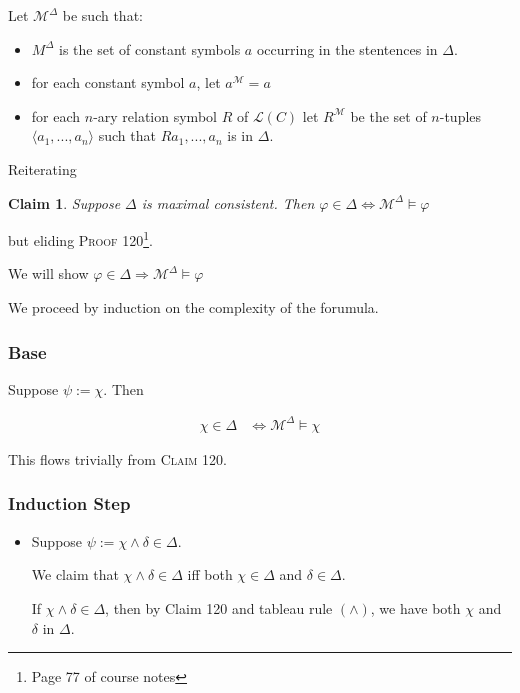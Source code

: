 \documentclass[a4paper]{article}
\newtheorem{claim}{Claim}
\newcommand{\MODEL}{\mathcal{M}}
\newcommand{\LANGUAGE}{\mathcal{L}}
\newcommand{\TUPLE}[1]{\langle {#1} \rangle}
\begin{document}
\begin{enumerate}
Let $\MODEL^{\Delta}$ be such that:

\begin{itemize}
    \item $M^{\Delta}$ is the set of constant symbols $a$ occurring in the stentences in $\Delta$.
    \item for each constant symbol $a$, let $a^{\MODEL} = a$
    \item for each $n$-ary relation symbol $R$ of $\LANGUAGE(C)$ let $R^{\MODEL}$ be the set of $n$-tuples $\TUPLE{a_1, ..., a_n}$ such that $Ra_1,...,a_n$ is in $\Delta$.
\end{itemize}

Reiterating

\begin{claim}
    Suppose $\Delta$ is maximal consistent. Then $\varphi \in \Delta \Leftrightarrow \MODEL^{\Delta} \models \varphi$
\end{claim}

but eliding \textsc{Proof 120}\footnote{Page 77 of course notes}.

We will show $\varphi \in \Delta \Rightarrow \MODEL^{\Delta} \models \varphi$

We proceed by induction on the complexity of the forumula.

\subsubsection*{Base}

Suppose $\psi := \chi$. Then

    \begin{align*}
        \chi \in \Delta & \Leftrightarrow \MODEL^{\Delta} \models \chi
    \end{align*}

    This flows trivially from \textsc{Claim 120}.

\subsubsection*{Induction Step}

\begin{itemize}

    \item Suppose $\psi := \chi \wedge \delta \in \Delta$. 
    
    We claim that $\chi \wedge \delta \in \Delta$ iff both $\chi \in \Delta$ and $\delta \in \Delta$. 

    If $\chi \wedge \delta \in \Delta$, then by Claim 120 and tableau rule $(\wedge)$, we have both $\chi$ and $\delta$ in $\Delta$.


\end{itemize}
\end{enumerate}
\end{document}
